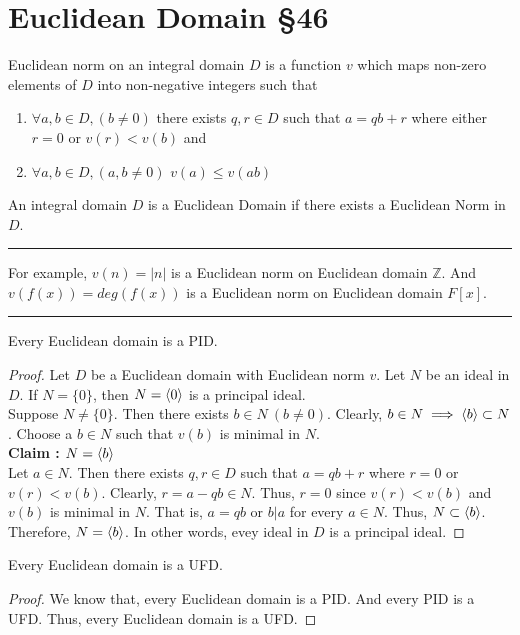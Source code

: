 \section{Euclidean Domain \S46}
\begin{definition}
	Euclidean norm on an integral domain $D$ is a function $v$ which maps non-zero elements of $D$ into non-negative integers such that 
	\begin{enumerate}
		\item $\forall a,b \in D, (b \ne 0)$ there exists $q,r \in D$ such that $a = qb + r$ where  either $r = 0$ or $v(r) < v(b)$ and 
		\item $\forall a,b \in D, (a,b \ne 0)$ $v(a) \le v(ab)$
	\end{enumerate}
\end{definition}
\begin{definition}
	An integral domain $D$ is a Euclidean Domain if there exists a Euclidean Norm in $D$.
\end{definition}
\hrule\vspace{1em}
For example, $v(n) = |n|$ is a Euclidean norm on Euclidean domain $\mathbb{Z}$. And $v(f(x)) = deg(f(x))$ is a Euclidean norm on Euclidean domain $F[x]$.
\hrule\vspace{1em}
\begin{theorem}
	Every Euclidean domain is a PID.
\end{theorem}
\begin{proof}
	Let $D$ be a Euclidean domain with Euclidean norm $v$.
	Let $N$ be an ideal in $D$.
	If $N = \{ 0\}$, then $N = \langle 0\rangle$ is a principal ideal.\\

	Suppose $N \ne \{ 0 \}$.
	Then there exists $b \in N\ (b \ne 0)$.
	Clearly, $b \in N \implies \langle b\rangle\subset N$.
	Choose a $b \in N$ such that $v(b)$ is minimal in $N$.\\

	\textbf{Claim : $N = \langle b\rangle$}\\
	Let $a \in N$.
	Then there exists $q,r \in D$ such that $a = qb + r$ where $r = 0$ or $v(r) < v(b)$.
	Clearly, $r = a-qb \in N$.
	Thus, $r = 0$ since $v(r) < v(b)$ and $v(b)$ is minimal in $N$.
	That is, $a = qb$ or $b|a$ for every $a \in N$.
	Thus, $N \subset \langle b\rangle$.
	Therefore, $N = \langle b\rangle$.
	In other words, evey ideal in $D$ is a principal ideal.
\end{proof}

\begin{corollary}
	Every Euclidean domain is a UFD.
\end{corollary}
\begin{proof}
	We know that, every Euclidean domain is a PID.
	And every PID is a UFD.
	Thus, every Euclidean domain is a UFD.
\end{proof}
